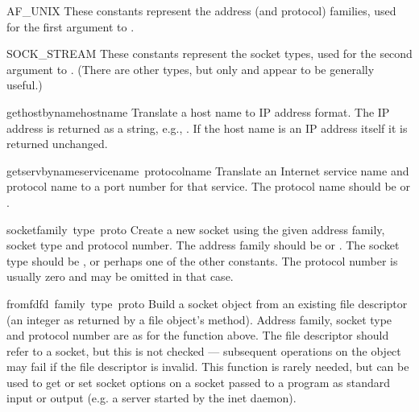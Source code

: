 \begin{datadesc}{AF_UNIX}
These constants represent the address (and protocol) families,
used for the first argument to .
\end{datadesc}

\begin{datadesc}{SOCK_STREAM}
These constants represent the socket types,
used for the second argument to .
(There are other types, but only  and
 appear to be generally useful.)
\end{datadesc}

\begin{funcdesc}{gethostbyname}{hostname}
Translate a host name to IP address format.  The IP address is
returned as a string, e.g.,  .  If the host name
is an IP address itself it is returned unchanged.
\end{funcdesc}

\begin{funcdesc}{getservbyname}{servicename\, protocolname}
Translate an Internet service name and protocol name to a port number
for that service.  The protocol name should be  or
.
\end{funcdesc}

\begin{funcdesc}{socket}{family\, type\, proto}
Create a new socket using the given address family, socket type and
protocol number.  The address family should be  or
.  The socket type should be ,
 or perhaps one of the other  constants.
The protocol number is usually zero and may be omitted in that case.
\end{funcdesc}

\begin{funcdesc}{fromfd}{fd\, family\, type\, proto}
Build a socket object from an existing file descriptor (an integer as
returned by a file object's  method).  Address family,
socket type and protocol number are as for the  function
above.  The file descriptor should refer to a socket, but this is not
checked --- subsequent operations on the object may fail if the file
descriptor is invalid.  This function is rarely needed, but can be
used to get or set socket options on a socket passed to a program as
standard input or output (e.g. a server started by the \UNIX{} inet
daemon).
\end{funcdesc}


